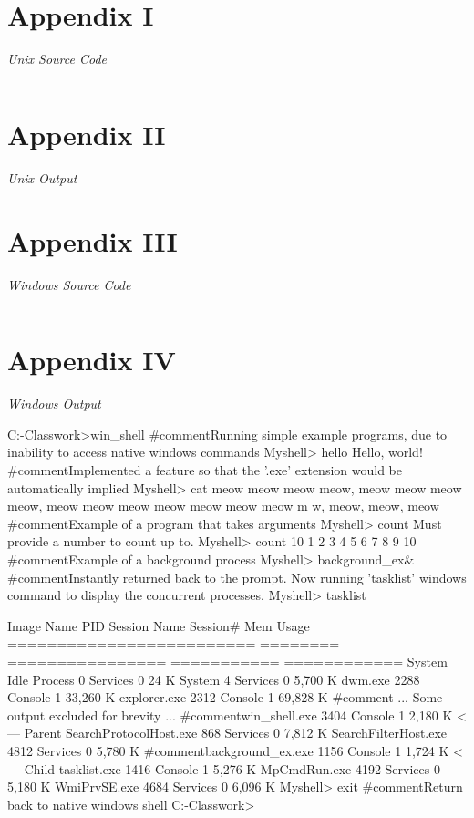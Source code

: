 \documentclass[12pt]{article}
\newcommand {\append}[2] {\section*{Appendix #1} \textsl{\large #2}}
\newcommand {\includesource}[2] {\inputminted[linenos, fontsize=\scriptsize, frame=lines]{#1}{#2}}
\begin{document}
\newpage

\append{I} {Unix Source Code}
\includesource{c}{unix_shell.c}


\append{II} {Unix Output}



\append{III} {Windows Source Code}
\includesource{c}{win_shell.c}


\append{IV} {Windows Output}
\begin{shelloutput}
C:\Users\Enrique\School\OS-Classwork>win_shell
#comment{Running simple example programs, due to inability to access native windows commands}
Myshell> hello
Hello, world!
#comment{Implemented a feature so that the '.exe' extension  would be automatically implied}
Myshell> cat
meow meow meow meow, meow meow meow meow, meow meow meow meow meow meow meow m
w, meow, meow, meow
#comment{Example of a program that takes arguments}
Myshell> count
Must provide a number to count up to.
Myshell> count 10
1
2
3
4
5
6
7
8
9
10
#comment{Example of a background process}
Myshell> background_ex\&
#comment{Instantly returned back to the prompt. Now running 'tasklist' windows command to display the concurrent processes.}
Myshell> tasklist

Image Name                     PID Session Name        Session#    Mem Usage
========================= ======== ================ =========== ============
System Idle Process              0 Services                   0         24 K
System                           4 Services                   0      5,700 K
dwm.exe                       2288 Console                    1     33,260 K
explorer.exe                  2312 Console                    1     69,828 K
#comment{ ... Some output excluded for brevity ...}
#comment{win_shell.exe                 3404 Console                    1      2,180 K   <--- Parent}
SearchProtocolHost.exe         868 Services                   0      7,812 K
SearchFilterHost.exe          4812 Services                   0      5,780 K
#comment{background_ex.exe             1156 Console                    1      1,724 K   <--- Child}
tasklist.exe                  1416 Console                    1      5,276 K
MpCmdRun.exe                  4192 Services                   0      5,180 K
WmiPrvSE.exe                  4684 Services                   0      6,096 K
Myshell> exit
#comment{Return back to native windows shell}
C:\Users\Enrique\School\OS-Classwork>
\end{shelloutput}
\end{document}

